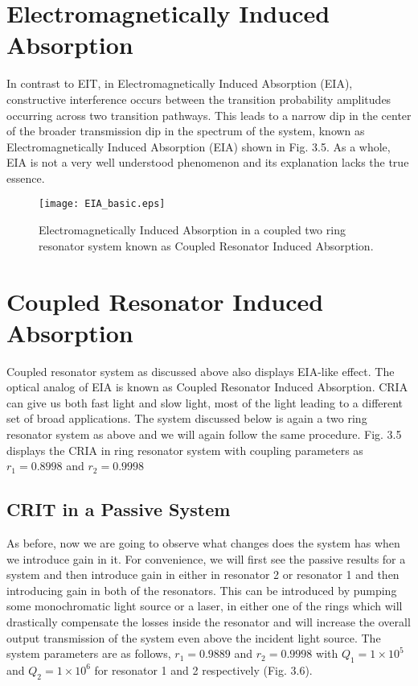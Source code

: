 \section{Electromagnetically Induced Absorption}
In contrast to EIT, in Electromagnetically Induced Absorption (EIA), constructive interference occurs between the transition probability amplitudes occurring across two transition pathways. This leads to a narrow dip in the center of the broader transmission dip in the spectrum of the system, known as Electromagnetically Induced Absorption (EIA) shown in Fig. 3.5. As a whole, EIA is not a very well understood phenomenon and its explanation lacks the true essence.

\begin{figure}[h]
\centering
\texttt{[image: EIA\_basic.eps]}
\caption{Electromagnetically Induced Absorption in a coupled two ring resonator system known as Coupled Resonator Induced Absorption.}
\end{figure}

\section{Coupled Resonator Induced Absorption} 
 
Coupled resonator system as discussed above also displays EIA-like effect. The optical analog of EIA is known as Coupled Resonator Induced Absorption. CRIA can give us both fast light and slow light, most of the light leading to a different set of broad applications. The system discussed below is again a two ring resonator system as above and we will again follow the same procedure. Fig. 3.5 displays the CRIA in ring resonator system with coupling parameters as $r_{1} = 0.8998$ and $r_{2} = 0.9998$


\subsection{CRIT in a Passive System}
As before, now we are going to observe what changes does the system has when we introduce gain in it. For convenience, we will first see the passive results for a system and then introduce gain in either in resonator 2 or resonator 1 and then introducing gain in both of the resonators. This can be introduced by pumping some monochromatic light source or a laser, in either one of the rings which will drastically compensate the losses inside the resonator and will increase the overall output transmission of the system even above the incident light source. The system parameters are as follows, $r_{1} = 0.9889$ and $r_{2} = 0.9998$ with $Q_{1} = 1\times10^{5}$ and $Q_{2} = 1\times10^{6}$ for resonator 1 and 2 respectively (Fig. 3.6). 

